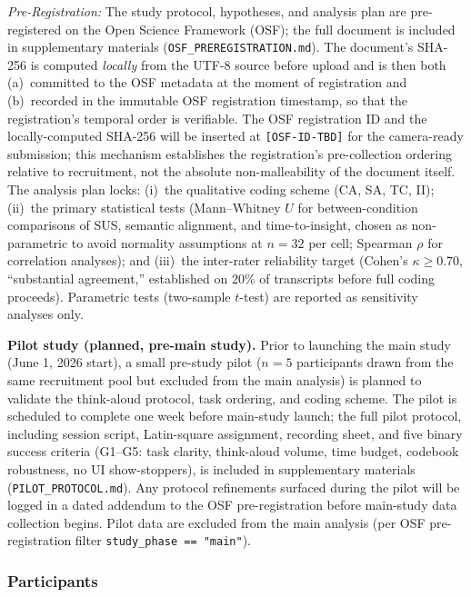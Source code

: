 \documentclass[journal,review]{vgtc}
\begin{document}
\textit{Pre-Registration:} The study protocol, hypotheses, and analysis plan are pre-registered on the Open Science Framework (OSF); the full document is included in supplementary materials (\texttt{OSF\_PREREGISTRATION.md}). The document's SHA-256 is computed \emph{locally} from the UTF-8 source before upload and is then both (a)~committed to the OSF metadata at the moment of registration and (b)~recorded in the immutable OSF registration timestamp, so that the registration's temporal order is verifiable. The OSF registration ID and the locally-computed SHA-256 will be inserted at \texttt{[OSF-ID-TBD]} for the camera-ready submission; this mechanism establishes the registration's pre-collection ordering relative to recruitment, not the absolute non-malleability of the document itself. The analysis plan locks: (i)~the qualitative coding scheme (CA, SA, TC, II); (ii)~the primary statistical tests (Mann--Whitney $U$ for between-condition comparisons of SUS, semantic alignment, and time-to-insight, chosen as non-parametric to avoid normality assumptions at $n=32$ per cell; Spearman $\rho$ for correlation analyses); and (iii)~the inter-rater reliability target (Cohen's $\kappa \geq 0.70$, ``substantial agreement,'' established on 20\% of transcripts before full coding proceeds). Parametric tests (two-sample $t$-test) are reported as sensitivity analyses only.

\textbf{Pilot study (planned, pre-main study).} Prior to launching the main
study (June 1, 2026 start), a small pre-study pilot ($n = 5$ participants
drawn from the same recruitment pool but excluded from the main analysis) is
planned to validate the think-aloud protocol, task ordering, and coding scheme.
The pilot is scheduled to complete one week before main-study launch; the full
pilot protocol, including session script, Latin-square assignment, recording
sheet, and five binary success criteria (G1--G5: task clarity, think-aloud
volume, time budget, codebook robustness, no UI show-stoppers), is included in
supplementary materials (\texttt{PILOT\_PROTOCOL.md}). Any protocol refinements
surfaced during the pilot will be logged in a dated addendum to the OSF
pre-registration before main-study data collection begins. Pilot data are
excluded from the main analysis (per OSF pre-registration filter
\texttt{study\_phase == "main"}).

\subsubsection{Participants}
\end{document}
